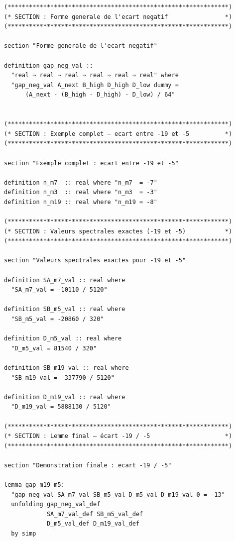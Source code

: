 \documentclass[a4paper,11pt]{article}
\begin{document}
\begin{holcode}[title={\textcolor{white}{Fichier : methode\_spectral.thy -- Partie 6/6 (FIN)}}]
\begin{lstlisting}
(**************************************************************)
(* SECTION : Forme generale de l'ecart negatif                *)
(**************************************************************)

section "Forme generale de l'ecart negatif"

definition gap_neg_val ::
  "real ⇒ real ⇒ real ⇒ real ⇒ real ⇒ real" where
  "gap_neg_val A_next B_high D_high D_low dummy =
      (A_next - (B_high - D_high) - D_low) / 64"


(**************************************************************)
(* SECTION : Exemple complet – ecart entre -19 et -5          *)
(**************************************************************)

section "Exemple complet : ecart entre -19 et -5"

definition n_m7  :: real where "n_m7  = -7"
definition n_m3  :: real where "n_m3  = -3"
definition n_m19 :: real where "n_m19 = -8"

(**************************************************************)
(* SECTION : Valeurs spectrales exactes (-19 et -5)           *)
(**************************************************************)

section "Valeurs spectrales exactes pour -19 et -5"

definition SA_m7_val :: real where
  "SA_m7_val = -10110 / 5120"

definition SB_m5_val :: real where
  "SB_m5_val = -20860 / 320"

definition D_m5_val :: real where
  "D_m5_val = 81540 / 320"

definition SB_m19_val :: real where
  "SB_m19_val = -337790 / 5120"

definition D_m19_val :: real where
  "D_m19_val = 5888130 / 5120"

(**************************************************************)
(* SECTION : Lemme final – écart -19 / -5                     *)
(**************************************************************)

section "Demonstration finale : ecart -19 / -5"

lemma gap_m19_m5:
  "gap_neg_val SA_m7_val SB_m5_val D_m5_val D_m19_val 0 = -13"
  unfolding gap_neg_val_def
            SA_m7_val_def SB_m5_val_def
            D_m5_val_def D_m19_val_def
  by simp



\end{lstlisting}
\end{holcode}
\end{document}
